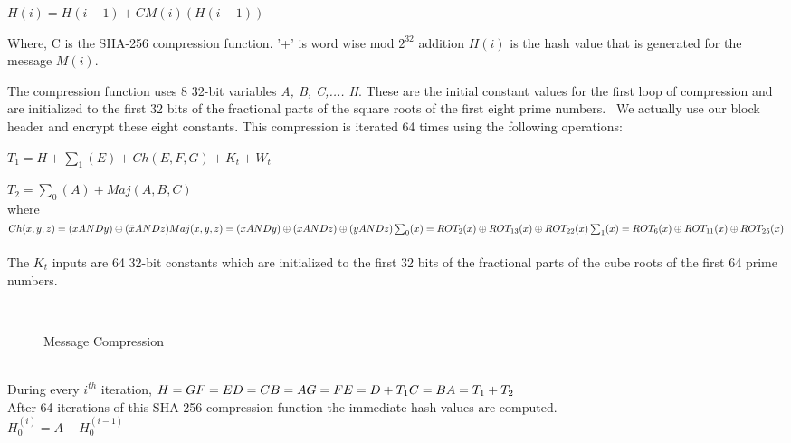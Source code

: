 $H(i) = H(i-1) + CM(i)(H(i-1))$

Where, C is the SHA-256 compression function.
'+' is word wise mod  $2^{32}$ addition
$H(i)$ is the hash value that is generated for the message $M(i)$.

The compression function uses 8 32-bit variables \textit{A, B, C,.... H}. These are the initial constant values for the first loop of compression and are initialized to the first 32 bits of the fractional parts of the square roots of the first eight prime numbers.~\cite{FPGA} We actually use our block header and encrypt these eight constants. This compression is iterated 64 times using the following operations:

$T_{1} = H + \sum_{1}(E)+ Ch(E,F,G) + K_{t} + W_{t}$

$T_{2} = \sum_{0}(A) + Maj(A,B,C)$
\\where
\\$Ch(x,y,z) = (x AND y) \oplus (\bar{x} AND z)
\\Maj(x,y,z) = (x AND y) \oplus (x AND z) \oplus (y AND z)
\\\sum_{0}(x)= ROT_{2}(x) \oplus ROT_{13}(x) \oplus ROT_{22}(x)
\\\sum_{1}(x)= ROT_{6}(x) \oplus ROT_{11}(x) \oplus ROT_{25}(x)$~~\cite{FPGA}\\The $K_{t}$ inputs are 64 32-bit constants which are initialized to the first 32 bits of the fractional parts of the cube roots of the first 64 prime numbers. \cite{FPGA}
\begin{figure}[ht]
	\begin{center}
	\end{center}
	\vspace{-1ex}
	\caption{Message Compression
		\label{Message Compression}}
	\vspace{-4ex} ~\cite{SHA-256}
\end{figure}
\\During every $i^{th}$ iteration, $ \\ H=G\\ F=E\\ D=C\\ B=A\\G=F\\E=D+T_{1}\\C=B\\ A= T_{1}+T_{2}$~\cite{FPGA}
\\After 64 iterations of this SHA-256 compression function the immediate hash values are computed. 
\\$H_{0}^{(i)} = A + H_{0}^{(i-1)}$
